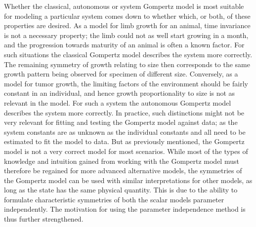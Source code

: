 Whether the classical, autonomous or system Gompertz model is most suitable for modeling a particular system comes down to whether which, or both, of these properties are desired.
As a model for limb growth for an animal, time invariance is not a necessary property; the limb could not as well start growing in a month, and the progression towards maturity of an animal is often a known factor.
For such situations the classical Gompertz model describes the system more correctly.
The remaining symmetry of growth relating to size then corresponds to the same growth pattern being observed for specimen of different size.
Conversely, as a model for tumor growth, the limiting factors of the environment should be fairly constant in an individual, and hence growth proportionality to size is not as relevant in the model.
For such a system the autonomous Gompertz model describes the system more correctly.
In practice, such distinctions might not be very relevant for fitting and testing the Gompertz model against data; as the system constants are as unknown as the individual constants and all need to be estimated to fit the model to data.
But as previously mentioned, the Gompertz model is not a very correct model for most scenarios.
While most of the types of knowledge and intuition gained from working with the Gompertz model must therefore be regained for more advanced alternative models, the symmetries of the Gompertz model can be used with similar interpretations for other models, as long as the state has the same physical quantity.
This is due to the ability to formulate characteristic symmetries of both the scalar models parameter independently.
The motivation for using the parameter independence method is thus further strengthened.

